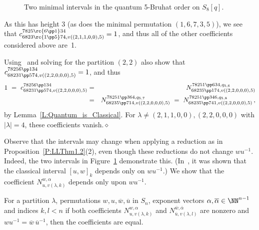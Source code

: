 \begin{example}
\begin{figure}[htb]
 \caption{Two minimal intervals in the quantum 5-Bruhat order on $S_8[q]$.}
  \label{F:qminimal}
\end{figure}

As this has height 3 (as does the minimal permutation $(1,6,7,3,5)$), we see that \newline
$c^{7825\rc{6\pp1}34}_{6823\rc{1\pp5}74, v((2,1,1,0,0),5)}=1$, and thus all of the other coefficients considered above are~1.

Using~\cite[Prop. 1.1.1]{BS-Bruhat} and solving for the partition  $(2,2)$ also show that $c^{78256\pp134}_{68231\pp574, v((2,2,0,0,0),5)}=1$, and thus
 \begin{eqnarray*}
    1\ =\ c^{78256\pp134}_{68231\pp574, v((2,2,0,0,0),5)}
    &=&  N^{78251\pp634, q_{5,6}}_{68235\pp174, v((2,2,0,0,0),5)}\\
    &=&  N^{78251\pp364, q_{5,7}}_{68235\pp714, v((2,2,0,0,0),5)}
    \ =\ N^{78251\pp346, q_{5,8}}_{68235\pp741, v((2,2,0,0,0),5)}\,,
 \end{eqnarray*}
by Lemma~\ref{L:Quantum_is_Classical}.
For $\lambda\neq(2,1,1,0,0), (2,2,0,0,0)$ with $|\lambda|=4$, these coefficients vanish.\hfill$\diamond$ 
\end{example}

Observe that the intervals may change when applying a reduction as in Proposition~\ref{P:LLThm1.2}(2), even though these
reductions do not change $wu^{-1}$.
Indeed, the two intervals in Figure~\ref{F:qminimal} demonstrate this.
(In~\cite{BS-Bruhat}, it was shown that the classical interval $[u,w]_k$ depends only on $wu^{-1}$.)
We show that the coefficient $N^{w,\alpha}_{u,v(\lambda,k)}$ depends only upon $wu^{-1}$.

\begin{theorem}\label{Th:quantumIndependence}
  For a partition $\lambda$, permutations $w,u,\overline{w},\overline{u}$ in $S_n$, exponent vectors
  $\alpha,\overline{\alpha}\in\NN^{n-1}$ and indices $k,l<n$
  if both coefficients $N^{w,\alpha}_{u,v(\lambda,k)}$ and
  $N^{\overline{w},\overline{\alpha}}_{\overline{u},v(\lambda,l)}$ are nonzero and $wu^{-1}=\overline{w}\,\overline{u}^{-1}$,
  then the coefficients are equal.
 \end{theorem}

